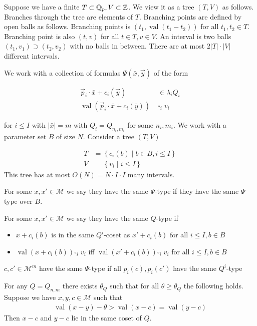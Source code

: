 \documentclass{amsart}
\newcommand{\M}{\mathcal M}
\newcommand{\curly}[1]{\left\{#1\right\}}
\DeclareMathOperator{\val}{val}
\begin{document}
Suppose we have a finite $T \subset \mathbb{Q}_p, V \subset \mathbb{Z}$.
We view it as a tree $(T, V)$ as follows.
Branches through the tree are elements of $T$.
Branching points are defined by open balls as follows.
Branching points is $(t_1, \val(t_1 - t_2))$ for all $t_1, t_2 \in T$.
Branching point is also $(t, v)$ for all $t \in T, v \in V$.
An interval is two balls $(t_1, v_1) \supset (t_2, v_2)$ with no balls in between.
There are at most $2|T| \cdot |V|$ different intervals.

We work with a collection of formulas $\Psi(\bar x, \vec y)$ of the form

\begin{align*}
	\vec p_i \cdot \bar x + c_i(\vec y) &\in \lambda_i Q_i \\
	\val(\vec p_i \cdot \bar x + c_i(\bar y)) \; &\square_i \; v_i
\end{align*}

for $i \leq I$ with $|\bar x| = m$ with $Q_i = Q_{n_i, m_i}$ for some $n_i, m_i$.
We work with a parameter set $B$ of size $N$.
Consider a tree $(T, V)$

\begin{align*}
	T &= \curly{c_i(b) \mid b \in B, i \leq I} \\
	V &= \curly{v_i \mid i \leq I}
\end{align*}
This tree has at most $O(N) = N \cdot I \cdot I$ many intervals.

For some $x, x' \in \M$ we say they have the same $\Psi$-type if they have the same $\Psi$ type over $B$.

For some $x, x' \in \M$ we say they have the same $Q$-type if
\begin{itemize}
	\item $x + c_i(b)$ is in the same $Q^i$-coset as $x' + c_i(b)$ for all $i \leq I, b \in B$
	\item $\val(x + c_i(b)) \square_i \; v_i$ iff $\val(x' + c_i(b)) \square_i \; v_i$ for all $i \leq I, b \in B$
\end{itemize}
 
\begin{Lemma}
	$c, c' \in \M^m$ have the same $\Psi$-type if all $p_i(c), p_i(c')$ have the same $Q^i$-type
\end{Lemma}

\begin{Lemma}
	For any $Q = Q_{n,m}$ there exists $\theta_Q$ such that for all $\theta \geq \theta_Q$ the following holds.
	Suppose we have $x,y,c \in \M$ such that
	\begin{align*}
		\val(x-y) - \theta > \val(x-c) = \val(y-c)
	\end{align*}
	Then $x-c$ and $y-c$ lie in the same coset of $Q$.
\end{Lemma}
\end{document}
